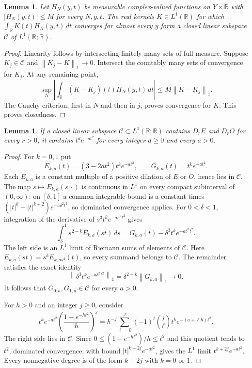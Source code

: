 \documentclass[11pt,a4paper]{article}
\newtheorem{lemma}[theorem]{Lemma}
\theoremstyle{definition}
\newenvironment{statementframe}
  {\par\addvspace{4pt}\noindent
   \setlength{\fboxsep}{6pt}\setlength{\fboxrule}{0.45pt}%
   \begin{lrbox}{\statementbox}%
   \begin{minipage}{\dimexpr\linewidth-2\fboxsep-2\fboxrule\relax}}
  {\end{minipage}\end{lrbox}%
   \fbox{\usebox{\statementbox}}\par\addvspace{4pt}}
\newcommand{\R}{\mathbb R}
\newcommand{\1}{\mathbf1}
\newcommand{\norm}[1]{\left\lVert #1\right\rVert}
\begin{document}
\begin{statementframe}
\begin{lemma}\label{lem:closure}
Let $H_N(y,t)$ be measurable complex-valued functions on $Y\times\R$
with $|H_N(y,t)|\le M$ for every $N,y,t$. The real kernels $K\in L^1(\R)$
for which $\int_\R K(t)H_N(y,t)\,dt$ converges for almost every $y$
form a closed linear subspace $\mathcal C$ of $L^1(\R;\R)$.
\end{lemma}
\end{statementframe}
\begin{proof}
Linearity follows by intersecting finitely many sets of full measure.
Suppose $K_j\in\mathcal C$ and $\norm{K_j-K}_1\to0$. Intersect the
countably many sets of convergence for $K_j$. At any remaining point,
\[
 \sup_N\left|\int_\R(K-K_j)(t)H_N(y,t)\,dt\right|
 \le M\norm{K-K_j}_1.
\]
The Cauchy criterion, first in $N$ and then in $j$, proves convergence
for $K$. This proves closedness.
\end{proof}

\begin{statementframe}
\begin{lemma}\label{lem:gaussian}
If a closed linear subspace $\mathcal C\subset L^1(\R;\R)$ contains
$D_rE$ and $D_rO$ for every $r>0$, it contains $t^de^{-at^2}$ for
every integer $d\ge0$ and every $a>0$.
\end{lemma}
\end{statementframe}
\begin{proof}
For $k=0,1$ put
\[
 E_{k,a}(t)=(3-2at^2)t^ke^{-at^2},\qquad G_{k,a}(t)=t^ke^{-at^2}.
\]
Each $E_{k,a}$ is a constant multiple of a positive dilation of $E$ or
$O$, hence lies in $\mathcal C$. The map $s\mapsto E_{k,a}(s\,\cdot)$
is continuous in $L^1$ on every compact subinterval of $(0,\infty)$:
on $[\delta,1]$ a common integrable bound is a constant times
$(|t|^k+|t|^{k+2})e^{-a\delta^2t^2}$, so dominated convergence applies.
For $0<\delta<1$, integration of the derivative of
$s^3t^ke^{-as^2t^2}$ gives
\begin{equation}\label{eq:euler}
 \int_\delta^1s^{2-k}E_{k,a}(st)\,ds
 =G_{k,a}(t)-\delta^3t^ke^{-a\delta^2t^2}.
\end{equation}
The left side is an $L^1$ limit of Riemann sums of elements of
$\mathcal C$. Here
$E_{k,a}(st)=s^kE_{k,as^2}(t)$, so every summand belongs to
$\mathcal C$. The remainder satisfies the exact identity
\[
 \norm{\delta^3t^ke^{-a\delta^2t^2}}_1
 =\delta^{2-k}\norm{G_{k,a}}_1\longrightarrow0.
\]
It follows that $G_{0,a},G_{1,a}\in\mathcal C$ for every $a>0$.

For $h>0$ and an integer $j\ge0$, consider
\[
 t^ke^{-at^2}\left(\frac{1-e^{-ht^2}}{h}\right)^j
 =h^{-j}\sum_{\ell=0}^j(-1)^\ell\binom j\ell
      t^ke^{-(a+\ell h)t^2}.
\]
The right side lies in $\mathcal C$. Since
$0\le(1-e^{-ht^2})/h\le t^2$ and this quotient tends to $t^2$,
dominated convergence, with bound $|t|^{k+2j}e^{-at^2}$, gives the
$L^1$ limit $t^{k+2j}e^{-at^2}$. Every nonnegative degree is of the
form $k+2j$ with $k=0$ or $1$.
\end{proof}
\end{document}
